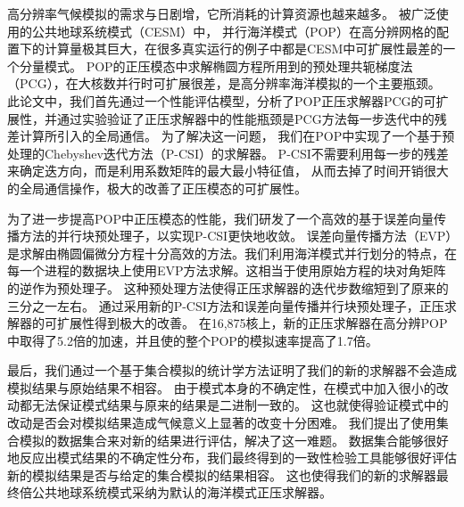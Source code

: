 \begin{cabstract}
  高分辨率气候模拟的需求与日剧增，它所消耗的计算资源也越来越多。 
  被广泛使用的公共地球系统模式（CESM）中， 并行海洋模式（POP）在高分辨网格的配置下的计算量极其巨大，在很多真实运行的例子中都是CESM中可扩展性最差的一个分量模式。 
  POP的正压模态中求解椭圆方程所用到的预处理共轭梯度法（PCG），在大核数并行时可扩展很差，是高分辨率海洋模拟的一个主要瓶颈。 
  此论文中，我们首先通过一个性能评估模型，分析了POP正压求解器PCG的可扩展性，并通过实验验证了正压求解器中的性能瓶颈是PCG方法每一步迭代中的残差计算所引入的全局通信。 
  为了解决这一问题， 我们在POP中实现了一个基于预处理的Chebyshev迭代方法（P-CSI）的求解器。
  P-CSI不需要利用每一步的残差来确定迭方向，而是利用系数矩阵的最大最小特征值，
  从而去掉了时间开销很大的全局通信操作，极大的改善了正压模态的可扩展性。

  为了进一步提高POP中正压模态的性能，我们研发了一个高效的基于误差向量传播方法的并行块预处理子，以实现P-CSI更快地收敛。 
  误差向量传播方法（EVP）是求解由椭圆偏微分方程十分高效的方法。我们利用海洋模式并行划分的特点，在每一个进程的数据块上使用EVP方法求解。这相当于使用原始方程的块对角矩阵的逆作为预处理子。
  这种预处理方法使得正压求解器的迭代步数缩短到了原来的三分之一左右。 
  通过采用新的P-CSI方法和误差向量传播并行块预处理子，正压求解器的可扩展性得到极大的改善。 在16,875核上，新的正压求解器在高分辨POP中取得了5.2倍的加速，并且使的整个POP的模拟速率提高了1.7倍。 
  

  最后，我们通过一个基于集合模拟的统计学方法证明了我们的新的求解器不会造成模拟结果与原始结果不相容。 
  由于模式本身的不确定性，在模式中加入很小的改动都无法保证模式结果与原来的结果是二进制一致的。
  这也就使得验证模式中的改动是否会对模拟结果造成气候意义上显著的改变十分困难。
  我们提出了使用集合模拟的数据集合来对新的结果进行评估，解决了这一难题。 数据集合能够很好地反应出模式结果的不确定性分布，我们最终得到的一致性检验工具能够很好评估新的模拟结果是否与给定的集合模拟的结果相容。  
  这也使得我们的新的求解器最终倍公共地球系统模式采纳为默认的海洋模式正压求解器。

\end{cabstract}


